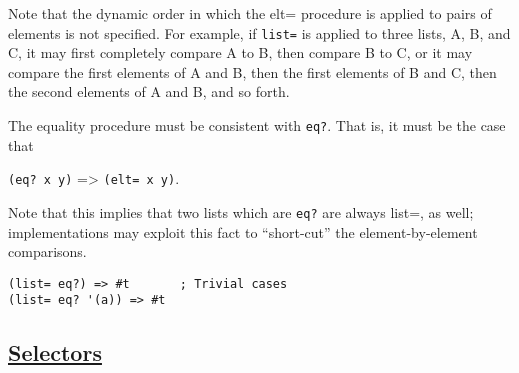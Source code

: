 \begin{description}
Note that the dynamic order in which the elt= procedure is applied to
pairs of elements is not specified. For example, if \texttt{list=} is
applied to three lists, A, B, and C, it may first completely compare A
to B, then compare B to C, or it may compare the first elements of A and
B, then the first elements of B and C, then the second elements of A and
B, and so forth.

The equality procedure must be consistent with \texttt{eq?}. That is, it
must be the case that

\texttt{(eq?\ x\ y)} =\textgreater{} \texttt{(elt=\ x\ y)}.

Note that this implies that two lists which are \texttt{eq?} are always
list=, as well; implementations may exploit this fact to ``short-cut''
the element-by-element comparisons.

\begin{verbatim}
(list= eq?) => #t       ; Trivial cases
(list= eq? '(a)) => #t
\end{verbatim}
\end{description}

\subsection{\texorpdfstring{\href{}{Selectors}}{Selectors}}\label{selectors}

